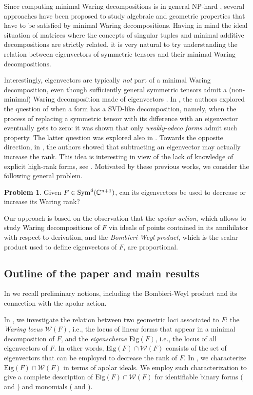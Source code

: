 \documentclass{amsart}
\numberwithin{theorem}{section}
\theoremstyle{definition}
\newtheorem*{problem*}{Problem}
\newcommand{\Eig}{\mathrm{Eig}}
\newcommand{\W}{\mathcal{W}}
\newcommand{\CC}{\mathbb{C}}
\newcommand{\sym}{\mathop{\rm Sym}\nolimits}
\begin{document}
Since computing minimal Waring decompositions is in general NP-hard \cite{HL13}, several approaches have been proposed to study algebraic and geometric properties that have to be satisfied by minimal Waring decompositions. Having in mind the ideal situation of matrices where the concepts of singular tuples and minimal additive decompositions are strictly related, it is very natural to try understanding the relation between eigenvectors of symmetric tensors and their minimal Waring decompositions. 

Interestingly, eigenvectors are typically \textit{not} part of a minimal Waring decomposition, even though sufficiently general symmetric tensors admit a (non-minimal) Waring decomposition made of eigenvectors \cite{DOT18}. In \cite{HT25}, the authors explored the question of when a form has a SVD-like decomposition, namely, when the process of replacing a symmetric tensor with its difference with an eigenvector eventually gets to zero: it was shown that only \textit{weakly-odeco forms} admit such property. The latter question was explored also in \cite{RHST25}. Towards the opposite direction, in \cite{SC10}, the authors showed that subtracting an eigenvector may actually increase the rank. This idea is interesting in view of the lack of knowledge of explicit high-rank forms, see \cite{buczynski2018locus}. Motivated by these previous works, we consider the following general problem.

\begin{problem*}
    Given $F \in \sym^d(\CC^{n+1})$, can its eigenvectors be used to decrease or increase its Waring rank? 
\end{problem*}

Our approach is based on the observation that the \textit{apolar action}, which allows to study Waring decompositions of $F$ via ideals of points contained in its annihilator with respect to derivation, and the \textit{Bombieri-Weyl product}, which is the scalar product used to define eigenvectors of $F$, are proportional.

\subsection*{Outline of the paper and main results}
In  we recall preliminary notions, including the Bombieri-Weyl product and its connection with the apolar action. 

In , we investigate the relation between two geometric loci associated to $F$: the \textit{Waring locus} $\W(F)$, i.e., the locus of linear forms that appear in a minimal decomposition of $F$, and the \textit{eigenscheme} $\Eig(F)$, i.e., the locus of all eigenvectors of $F$. In other words, $\Eig(F) \cap \W(F)$ consists of the set of eigenvectors that can be employed to decrease the rank of $F$. In , we characterize $\Eig(F) \cap \W(F)$ in terms of apolar ideals. We employ such characterization to give a complete description of $\Eig(F) \cap \W(F)$ for identifiable binary forms ( and ) and monomials ( and ). 
\end{document}
